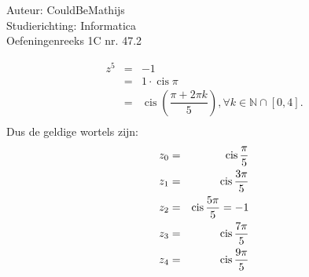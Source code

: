 \documentclass[a4paper]{article}
\newcommand{\cis}{\operatorname{cis}}
\begin{document}
  
\noindent \large Auteur: CouldBeMathijs \\
\noindent \large Studierichting: Informatica\\
\noindent \large Oefeningenreeks 1C nr. 47.2\\

\medskip

\normalsize

\begin{eqnarray*}
z^5 & = & -1 \\
    & = & 1 \cdot \cis \pi\\
    & = & \cis \left( \dfrac{\pi + 2\pi k}{5} \right), \forall k \in \mathbb{N} \cap [0, 4]. \\
\end{eqnarray*}
Dus de geldige wortels zijn: \\

\begin{eqnarray*}
\smallskip
z_0 & = & \cis \dfrac{\pi}{5} \\
\smallskip
z_1 & = & \cis \dfrac{3\pi}{5} \\
\smallskip
z_2 & = & \cis \dfrac{5\pi}{5} = -1 \\
\smallskip
z_3 & = & \cis \dfrac{7\pi}{5} \\
\smallskip
z_4 & = & \cis \dfrac{9\pi}{5}
\end{eqnarray*}


\begin{thebibliography}{999}
\end{thebibliography}
\end{document}
